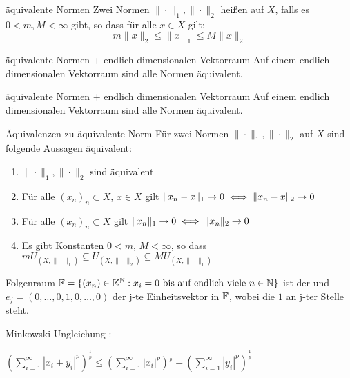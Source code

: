 	\begin{karte}{äquivalente Normen}
		Zwei Normen $\| \cdot \|_{1}, \| \cdot \|_{2}$ hei{\ss}en  auf $X$, falls es $0 < m, M < \infty$ gibt, so dass für alle $ x \in X$ gilt:
		\[ m \| x \|_{2} \leq \| x \|_{1} \leq M \| x \|_{2} \]
	\end{karte}
	
	\begin{karte}{äquivalente Normen + endlich dimensionalen Vektorraum}
		Auf einem endlich dimensionalen Vektorraum sind alle Normen äquivalent.
	\end{karte}
	
	\begin{karte}{äquivalente Normen + endlich dimensionalen Vektorraum}
		Auf einem endlich dimensionalen Vektorraum sind alle Normen äquivalent.
	\end{karte}
	
	\begin{karte}{Äquivalenzen zu äquivalente Norm}
		Für zwei Normen $\| \cdot \|_{1}, \| \cdot \|_{2}$ auf $X$ sind folgende Aussagen äquivalent:
		\begin{enumerate}[label=\alph*\upshape)]
			\item $\| \cdot \|_{1}, \| \cdot \|_{2}$ sind äquivalent
			\item Für alle $(x_{n})_{n} \subset X$, $x \in X$ gilt $\| x_{n} - x \|_{1} \rightarrow 0 \iff \| x_{n} - x \|_{2} \rightarrow 0 $
			\item Für alle $(x_{n})_{n} \subset X$ gilt $\| x_{n} \|_{1} \rightarrow 0 \iff \| x_{n} \|_{2} \rightarrow 0 $
			\item Es gibt Konstanten $0 < m$, $M < \infty$, so dass $m U_{(X, \| \cdot \|_{1})} \subseteq U_{(X, \| \cdot \|_{2})} \subseteq M U_{(X, \| \cdot \|_{1})}$
		\end{enumerate}
	\end{karte}
	
	\begin{karte}{Folgenraum}	
		$\mathbb{F} = \{ (x_{n}) \in \mathbb{K}^{\mathbb{N}}: x_{i} = 0 \text{ bis auf endlich viele } n \in \mathbb{N} \} $ ist der  und $e_{j} = (0, \dotsc, 0, 1, 0, \dotsc, 0) $ der j-te Einheitsvektor in $\mathbb{F}$, wobei die $1$ an j-ter Stelle steht.
	\end{karte}		

	\begin{karte}{Minkowski-Ungleichung}
			: 
			
			$\left( \sum_{i=1}^{\infty} |x_{i} + y_{i}|^p\right)^{\frac{1}{p}} \leq\left( \sum_{i=1}^{\infty} |x_{i}|^p\right)^{\frac{1}{p}} + \left( \sum_{i=1}^{\infty} |y_{i}|^p\right)^{\frac{1}{p}} $	\\
	\end{karte}
	
